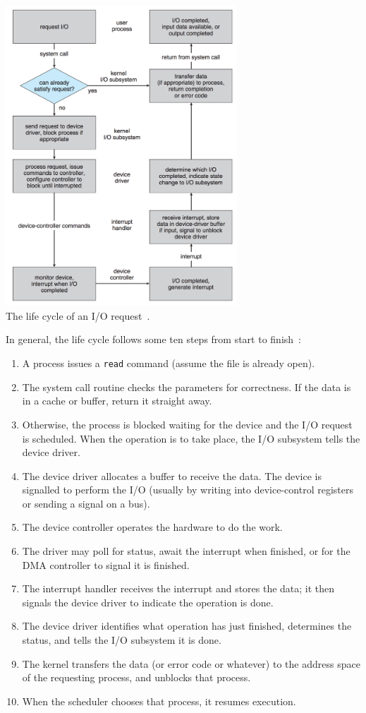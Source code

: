 \begin{center}
	\includegraphics[width=0.65\textwidth]{images/io-lifecycle.png}\\
	The life cycle of an I/O request~\cite{osc}.
\end{center}

In general, the life cycle follows some ten steps from start to finish~\cite{osc}:

\begin{enumerate}
	\item A process issues a \texttt{read} command (assume the file is already open).
	\item The system call routine checks the parameters for correctness. If the data is in a cache or buffer, return it straight away.
	\item Otherwise, the process is blocked waiting for the device and the I/O request is scheduled. When the operation is to take place, the I/O subsystem tells the device driver.
	\item The device driver allocates a buffer to receive the data. The device is signalled to perform the I/O (usually by writing into device-control registers or sending a signal on a bus).
	\item The device controller operates the hardware to do the work.
	\item The driver may poll for status, await the interrupt when finished, or for the DMA controller to signal it is finished.
	\item The interrupt handler receives the interrupt and stores the data; it then signals the device driver to indicate the operation is done.
	\item The device driver identifies what operation has just finished, determines the status, and tells the I/O subsystem it is done.
	\item The kernel transfers the data (or error code or whatever) to the address space of the requesting process, and unblocks that process.
	\item When the scheduler chooses that process, it resumes execution.
\end{enumerate}



